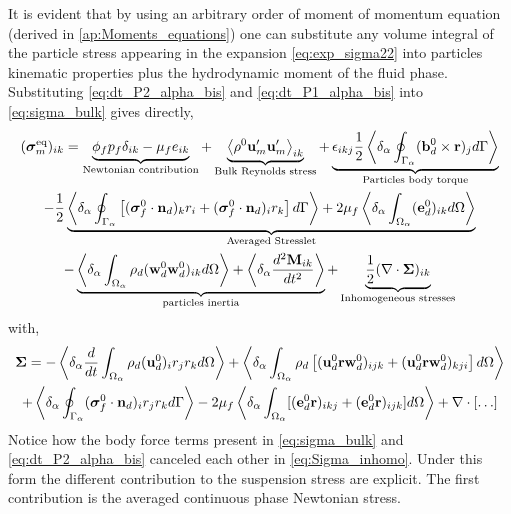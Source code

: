 It is evident that by using an arbitrary order of moment of momentum equation (derived in \ref{ap:Moments_equations}) one can substitute any volume integral of the particle stress appearing in the expansion \ref{eq:exp_sigma22} into particles kinematic properties plus the hydrodynamic moment of the fluid phase. 
Substituting \ref{eq:dt_P2_alpha_bis} and \ref{eq:dt_P1_alpha_bis} into \ref{eq:sigma_bulk} gives directly, 
\begin{multline}
    (\bm{\sigma}^\text{eq}_m)_{ik}
    = 
    \underbrace{
        \phi_f p_f 
    \delta_{ik}
    - \mu_f e_{ik} 
    }_\text{Newtonian contribution}
    + \underbrace{\left<\rho^0 \textbf{u}'_m\textbf{u}'_m\right>_{ik}}_\text{Bulk Reynolds stress}
    + \underbrace{\epsilon_{ikj} \frac{1}{2}\left<\delta_\alpha \oint_{\Gamma_\alpha}  (\textbf{b}_d^0 \times \textbf{r})_j d\Gamma\right>}_\text{Particles body torque}\\
    - \frac{1}{2}\underbrace{\left<\delta_\alpha \oint_{\Gamma_\alpha} \left[
        (\bm{\sigma}_f^0 \cdot \textbf{n}_d)_kr_i  
        + (\bm{\sigma}_f^0 \cdot \textbf{n}_d)_i r_k
    \right] d\Gamma\right>
    + 2 \mu_f \left<\delta_\alpha \int_{\Omega_\alpha} (\textbf{e}_d^0)_{ik} d\Omega\right>}_\text{Averaged Stresslet}\\
    - \underbrace{\left<\delta_\alpha \int_{\Omega_\alpha}  \rho_d (\textbf{w}_d^0\textbf{w}_d^0  )_{ik} d\Omega\right>
    + \left<\delta_\alpha \frac{d^2 \textbf{M}_{ik}}{dt^2}  \right>}_\text{particles inertia}
    + \underbrace{\frac{1}{2} (\mathbf{\nabla}\cdot\bm{\Sigma})_{ik}}_\text{Inhomogeneous stresses}
    \label{eq:stress_bulk_explicit}
\end{multline}
with,
\begin{multline}
    \bm{\Sigma}
    = 
    - \left<\delta_\alpha \frac{d}{dt}\int_{\Omega_\alpha}  \rho_d (\textbf{u}_d^0)_i r_j r_k  d\Omega\right>
    + \left<\delta_\alpha \int_{\Omega_\alpha}  
        \rho_d \left[
        (\textbf{u}^0_d\textbf{r}\textbf{w}_d^0)_{ijk} +  (\textbf{u}^0_d\textbf{r}\textbf{w}_d^0)_{kji}
    \right]
     d\Omega\right>\\
    +\left<\delta_\alpha \oint_{\Gamma_\alpha}   (\bm{\sigma}_f^0 \cdot \textbf{n}_d)_i r_{j}  r_{k}   d\Gamma\right>
    - 2 \mu_f \left<\delta_\alpha \int_{\Omega_\alpha} [( \textbf{e}_d^0 \textbf{r})_{ikj}
    + ( \textbf{e}_d^0 \textbf{r})_{ijk}] d\Omega\right> + \mathbf{\nabla}\cdot[\ldots]
    \label{eq:Sigma_inhomo}
\end{multline}
Notice how the body force terms present in \ref{eq:sigma_bulk} and \ref{eq:dt_P2_alpha_bis} canceled each other in \ref{eq:Sigma_inhomo}. 
Under this form the different contribution to the suspension stress are explicit. 
The first contribution is the averaged continuous phase Newtonian stress. 
